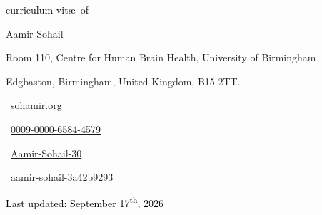 \begin{scriptsize}
	 \textcolor{black}{curriculum vit\ae~of}
\end{scriptsize}

\begin{Large} 
	Aamir Sohail
\end{Large}

\vspace*{0.4em}
\begin{scshape}
	\begin{scriptsize}
		  \textcolor{highlight2}{Room 110, Centre for Human Brain Health, University of Birmingham}
		  
		  \vspace*{-1ex}
		  \textcolor{highlight2}{Edgbaston,
		  	Birmingham, United Kingdom, B15 2TT.}
	\end{scriptsize}
\end{scshape}
\vspace*{0.25cm}

\begin{footnotesize}
	\begin{tiny}\faHome\end{tiny}~\href{https://sohamir.org}
	{sohamir.org
	}
	\quad {} 
	
	
	\begin{tiny}\aiOrcid\end{tiny}~\href{https://orcid.org/my-orcid?emailVerified=true&orcid=0009-0000-6584-4579}{0009-0000-6584-4579}
	\quad 
	\begin{tiny}\aiResearchGate\end{tiny}~\href{https://www.researchgate.net/profile/Aamir-Sohail-30}{Aamir-Sohail-30}
		\quad
	\begin{tiny}\faLinkedin\end{tiny}~\href{https://www.linkedin.com/in/aamir-sohail-3a42b9293}{aamir-sohail-3a42b9293}
	

\end{footnotesize}

\vspace*{0cm}
\begin{center}
\textcolor{black}{\small{Last updated: September 17\textsuperscript{th}, 2026}}
\end{center}